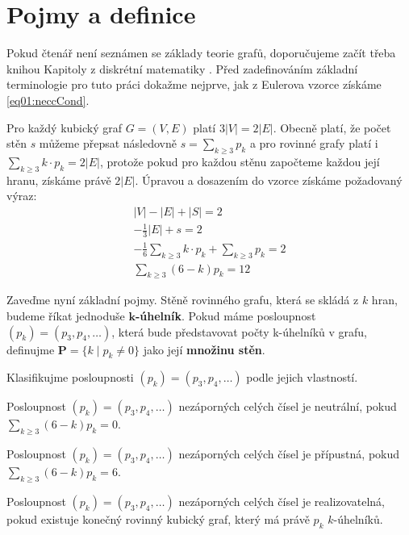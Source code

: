 
\chapter{Pojmy a definice}

Pokud čtenář není seznámen se základy teorie grafů, doporučujeme začít třeba knihou Kapitoly z diskrétní matematiky \cite{Matousek}. Před zadefinováním základní terminologie pro tuto práci dokažme nejprve, jak z Eulerova vzorce získáme \eqref{eq01:neccCond}. 

\begin{dukaz}
Pro každý kubický graf $G = (V,E)$ platí $3 |V| = 2 |E|$. Obecně platí, že počet stěn $s$ můžeme přepsat následovně $s = \sum_{k \geq 3}{p_k}$ a pro rovinné grafy platí i $ \sum_{k \geq 3}{k \cdot p_k}= 2|E|$, protože pokud pro každou stěnu započteme každou její hranu, získáme právě $2|E|$. Úpravou a dosazením do vzorce získáme požadovaný výraz: 
\begin{align*}
|V|-|E|+|S|=2 \\ -\frac{1}{3} |E| + s = 2 \\
-\frac{1}{6} \sum_{k \geq 3}{k \cdot p_k} + \sum_{k \geq 3}{p_k} = 2 \\ 
\sum_{k \geq 3}{(6-k)p_k}=12
\end{align*}
\end{dukaz}

Zaveďme nyní základní pojmy. Stěně rovinného grafu, která se skládá z $k$ hran, budeme říkat jednoduše \textbf{$\boldsymbol{k}$-úhelník}. Pokud máme posloupnost $(p_k) = (p_3,p_4,\dots)$, která bude představovat počty k-úhelníků v grafu, definujme $\boldsymbol{P} = \lbrace k \mid p_k \neq 0 \rbrace$ jako její \textbf{množinu stěn}.

Klasifikujme posloupnosti $(p_k) = (p_3,p_4,\dots)$ podle jejich vlastností.

\begin{definice}\label{def01:neutralni}
Posloupnost $(p_k) = (p_3,p_4,\dots)$ nezáporných celých čísel je neutrální, pokud $\sum_{k \geq 3}{(6-k)p_k}=0$.
\end{definice}

\begin{definice}\label{def01:pripustna}
Posloupnost $(p_k) = (p_3,p_4,\dots)$ nezáporných celých čísel je přípustná, pokud $\sum_{k \geq 3}{(6-k)p_k}=6$.
\end{definice}

\begin{definice}\label{def01:realizovatelna}
Posloupnost $(p_k) = (p_3,p_4,\dots)$ nezáporných celých čísel je realizovatelná, pokud existuje konečný rovinný kubický graf, který má právě $p_k$ $k$-úhelníků.
\end{definice}

